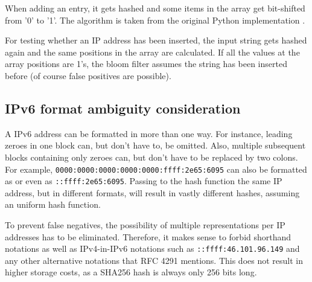 When adding an entry, it gets hashed and some items in the array get bit-shifted from '0' to '1'. The algorithm is taken from the original Python implementation \cite{SimpleBloomFilter}.



For testing whether an IP address has been inserted, the input string gets hashed again and the same positions in the array are calculated. If all the values at the array positions are 1's, the bloom filter assumes the string has been inserted before (of course false positives are possible).




\subsection{IPv6 format ambiguity consideration}

A IPv6 address can be formatted in more than one way. \cite{RFC4291I66} For instance, leading zeroes in one block can, but don't have to, be omitted. Also, multiple subsequent blocks containing only zeroes can, but don't have to be replaced by two colons.
For example, \texttt{0000:0000:0000:0000:0000:ffff:2e65:6095} can also be formatted as
 or even as \texttt{::ffff:2e65:6095}. Passing to the hash function the same IP address, but in different formats, will result in vastly different hashes, assuming an uniform hash function.

To prevent false negatives, the possibility of multiple representations per IP addresses has to be eliminated. Therefore, it makes sense to forbid shorthand notations as well as IPv4-in-IPv6 notations such as \texttt{::ffff:46.101.96.149} and any other alternative notations that RFC 4291 \cite{RFC4291I66} mentions.
This does not result in higher storage costs, as a SHA256 hash is always only 256 bits long.


